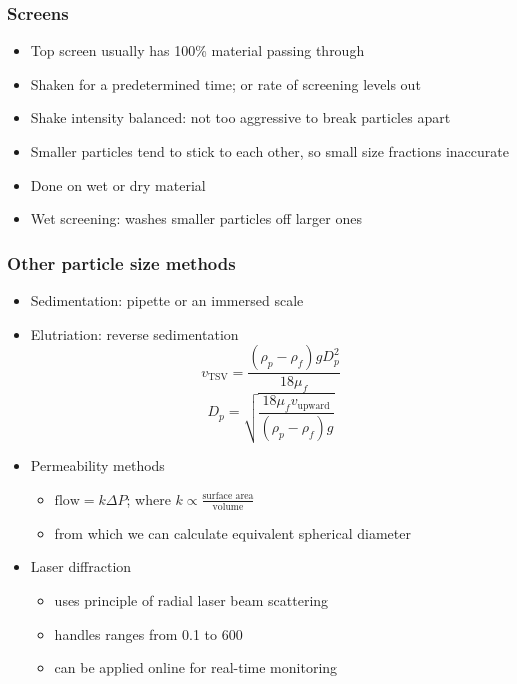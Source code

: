 \begin{frame}\frametitle{Screens}
	\begin{itemize}
		\item	Top screen usually has 100\% material passing through
		\item	Shaken for a predetermined time; or rate of screening levels out
		\item	Shake intensity balanced: not too aggressive to break particles apart
		\item	Smaller particles tend to stick to each other, so small size fractions inaccurate
		\item	Done on wet or dry material
		\item	Wet screening: washes smaller particles off larger ones
	\end{itemize}
\end{frame}

\begin{frame}\frametitle{Other particle size methods}
	\begin{itemize}		
		\item	Sedimentation: pipette or an immersed scale 
		\item	Elutriation: reverse sedimentation
				\[
					v_\text{TSV} = \frac{\left( \rho_p - \rho_f \right) g D_p^2}{18 \mu_f} 
				\]
				\[
					D_p = \sqrt{\frac{ 18 \mu_f v_\text{upward}}{\left( \rho_p - \rho_f \right) g} }					
				\]
		\item	Permeability methods
			\begin{itemize}
				\item	$\text{flow} = k \Delta P$; where $k \propto \displaystyle \frac{\text{surface area}}{\text{volume}}$ 
				\item	from which we can calculate equivalent spherical diameter
			\end{itemize}
		\item	Laser diffraction
			\begin{itemize}
				\item	uses principle of radial laser beam scattering
				\item	handles ranges from 0.1 to 600 \micron
				\item	can be applied online for real-time monitoring
			\end{itemize}
	\end{itemize}
\end{frame}

